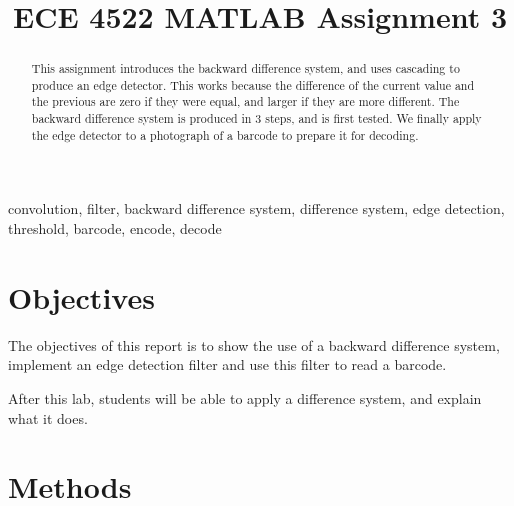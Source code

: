 \documentclass[conference]{../lib/IEEEtran}
\begin{document}
\title{ECE 4522 MATLAB Assignment 3}

\author{
}

\maketitle

\begin{abstract}
This assignment introduces the backward difference system, and uses cascading to produce an edge detector. This works because the difference of the current value and the previous are zero if they were equal, and larger if they are more different. The backward difference system is produced in 3 steps, and is first tested. We finally apply the edge detector to a photograph of a barcode to prepare it for decoding.
\end{abstract}

\begin{IEEEkeywords}
convolution, filter, backward difference system, difference system, edge detection, threshold, barcode, encode, decode
\end{IEEEkeywords}

\section{Objectives}

The objectives of this report is to show the use of a backward difference system, implement an edge detection filter and use this filter to read a barcode.

After this lab, students will be able to apply a difference system, and explain what it does.

\section{Methods}
\end{document}
